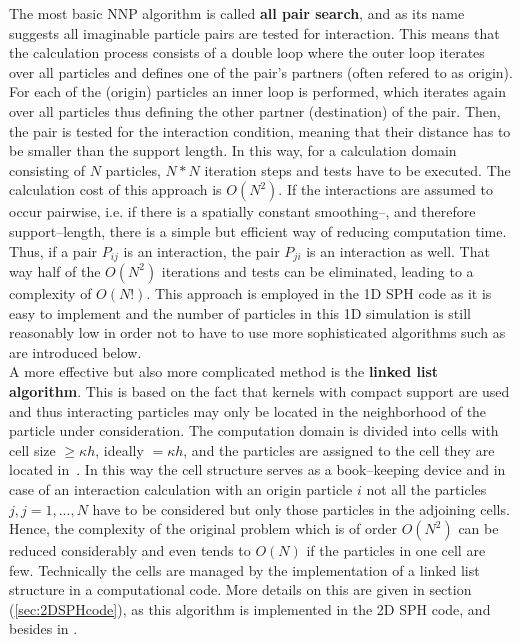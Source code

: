 \documentclass{report}
\begin{document}
The most basic NNP algorithm is called {\bf all pair search}, and as its name
suggests all imaginable particle pairs are tested for interaction. This means
that the calculation process consists of a double loop where the outer loop
iterates over all particles and defines one of the pair's partners (often
refered to as origin). For each of the (origin) particles an inner loop is
performed, which iterates again over all particles thus defining the other
partner (destination) of the pair. Then, the pair is tested for the
interaction condition, meaning that their distance has to be smaller than the
support length. In this way, for a calculation domain consisting of $N$
particles, $N*N$ iteration steps and tests have to be executed. The
calculation cost of this approach is $O(N^2)$. 
If the
interactions are assumed to occur pairwise, i.e. if there is a spatially constant
smoothing--, and therefore support--length,
there is a simple but efficient way of reducing computation
time. Thus, if a pair $P_{ij}$ is an interaction, the pair
$P_{ji}$ is an interaction as well. That way half of the $O(N^2)$ iterations
and tests can be eliminated, leading to a complexity of $O(N!)$. 
This approach is employed in the 1D SPH code as it is easy to
implement\cite{Liu2003} and the number of particles in this 1D simulation is
still reasonably low in order not to have to use more sophisticated algorithms
such as are introduced below.
\\
A more effective but also more complicated method is the {\bf linked list
algorithm}. This is based on the fact that kernels with compact support are
used and thus interacting particles may only be located in the neighborhood of
the particle under consideration. The computation domain is divided into cells with
cell size $\ge \kappa h$, ideally $=\kappa h$, and the
particles are assigned to the cell they are located in~\cite{Monaghan1983}. In this way the cell
structure serves as a book--keeping device and in case of an interaction
calculation with an origin particle $i$ not all the particles $j,j={1,...,N}$ have
to be considered but only those particles in the adjoining cells. Hence, the
complexity of the original problem which is of order $O(N^2)$ can be reduced
considerably and even tends to $O(N)$ if the particles in one cell are few. 
Technically the cells are managed by the implementation of a linked list
structure in a computational code. More details on this are given in section
(\ref{sec:2DSPHcode}), as this algorithm is implemented in the 2D
SPH code, and besides in \cite{Monaghan1985, Hockney1988}.
\end{document}
